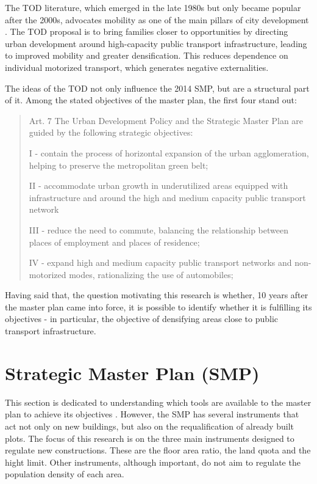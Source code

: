 The TOD literature, which emerged in the late 1980s but only became popular after the 2000s, advocates mobility as one of the main pillars of city development \cite{Ibraeva2020}. The TOD proposal is to bring families closer to opportunities by directing urban development around high-capacity public transport infrastructure, leading to improved mobility and greater densification. This reduces dependence on individual motorized transport, which generates negative externalities.

The ideas of the TOD not only influence the 2014 SMP, but are a structural part of it. Among the stated objectives of the master plan, the first four stand out:

{\small
\begin{quote}
    Art. 7 The Urban Development Policy
    and the Strategic Master Plan are guided by the
    following strategic objectives:

    I - contain the process of horizontal expansion of the urban agglomeration, helping to preserve the metropolitan green belt;

    II - accommodate urban growth in underutilized areas equipped with infrastructure and around the high and medium capacity public transport network

    III - reduce the need to commute, balancing the relationship between places of employment and places of residence;

    IV - expand high and medium capacity public transport networks and non-motorized modes, rationalizing the use of automobiles;
\end{quote}
}
Having said that, the question motivating this research is whether, 10 years after the master plan came into force, it is possible to identify whether it is fulfilling its objectives - in particular, the objective of densifying areas close to public transport infrastructure.

\section{Strategic Master Plan (SMP)}
\label{sec:master-plan}

This section is dedicated to understanding which tools are available to the master plan to achieve its objectives \cite{PDE2002, PDE2014, PDE2023}. However, the SMP has several instruments that act not only on new buildings, but also on the requalification of already built plots. The focus of this research is on the three main instruments designed to regulate new constructions. These are the floor area ratio, the land quota and the hight limit. Other instruments, although important, do not aim to regulate the population density of each area.

